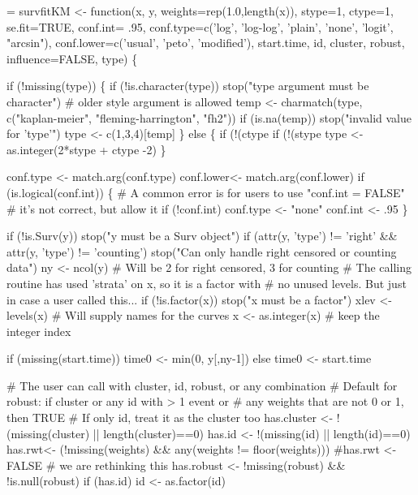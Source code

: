 \documentclass{article}
\begin{document}
\begin{nwchunk}
=
 survfitKM <- function(x, y, weights=rep(1.0,length(x)), 
                       stype=1, ctype=1,
                       se.fit=TRUE,
                       conf.int= .95,
                       conf.type=c('log',  'log-log',  'plain', 'none', 
                                   'logit', "arcsin"),
                       conf.lower=c('usual', 'peto', 'modified'),
                       start.time, id, cluster, robust, influence=FALSE,
                       type) \{
     
     if (!missing(type)) \{
         if (!is.character(type)) stop("type argument must be character")
         # older style argument is allowed
         temp <- charmatch(type, c("kaplan-meier", "fleming-harrington", "fh2"))
         if (is.na(temp)) stop("invalid value for 'type'")
         type <- c(1,3,4)[temp]
     \}
     else \{
         if (!(ctype %
         if (!(stype %
         type <- as.integer(2*stype + ctype  -2)
     \}
  
     conf.type <- match.arg(conf.type)
     conf.lower<- match.arg(conf.lower)
     if (is.logical(conf.int)) \{
         # A common error is for users to use "conf.int = FALSE"
         #  it's not correct, but allow it
         if (!conf.int) conf.type <- "none"
         conf.int <- .95
     \}
       
     if (!is.Surv(y)) stop("y must be a Surv object")
     if (attr(y, 'type') != 'right' && attr(y, 'type') != 'counting')
             stop("Can only handle right censored or counting data")
     ny <- ncol(y)       # Will be 2 for right censored, 3 for counting
     # The calling routine has used 'strata' on x, so it is a factor with
     #  no unused levels.  But just in case a user called this...
     if (!is.factor(x)) stop("x must be a factor")
     xlev <- levels(x)   # Will supply names for the curves
     x <- as.integer(x)  # keep the integer index
 
     if (missing(start.time)) time0 <- min(0, y[,ny-1])
     else time0 <- start.time
 
     # The user can call with cluster, id, robust, or any combination
     # Default for robust: if cluster or any id with > 1 event or 
     #  any weights that are not 0 or 1, then TRUE
     # If only id, treat it as the cluster too
     has.cluster <- !(missing(cluster) || length(cluster)==0) 
     has.id <-      !(missing(id) || length(id)==0)
     has.rwt<-      (!missing(weights) && any(weights != floor(weights)))
     #has.rwt <- FALSE   # we are rethinking this
     has.robust <-  !missing(robust) && !is.null(robust)
     if (has.id) id <- as.factor(id)
 

\end{nwchunk}
\end{document}

